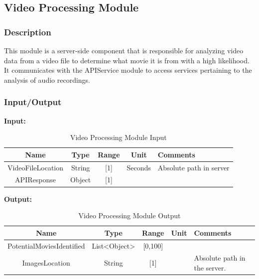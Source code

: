 \documentclass{article}
\begin{document}
\subsection{Video Processing Module}

\subsubsection{Description}

This module is a server-side component that is responsible for analyzing video data from a video file to determine what movie it is from with a high likelihood. It communicates with the APIService module to access services pertaining to the analysis of audio recordings.

\subsubsection{Input/Output}
\textbf{Input:}
\begin{table}[H]
    \caption{Video Processing Module Input}
    \centering
    \begin{tabularx}{0.7\textwidth}{|c|c|c|c|X|} \hline
        \textbf{Name} & \textbf{Type} & \textbf{Range} & \textbf{Unit} & \textbf{Comments} \\ \hline
        VideoFileLocation & String & [1] & Seconds & Absolute path in server \\ \hline
        APIResponse & Object & [1] & & \\ \hline
    \end{tabularx}
    \label{tab:Video_Processing_Input}
\end{table}

\textbf{Output:}
\begin{table}[H]
    \caption{Video Processing Module Output}
    \centering
    \begin{tabularx}{0.7\textwidth}{|c|c|c|c|X|} \hline
        \textbf{Name} & \textbf{Type} & \textbf{Range} & \textbf{Unit} & \textbf{Comments} \\ \hline
        PotentialMoviesIdentified & List<Object> & [0,100] & &\\ \hline
        ImagesLocation & String & [1] & & Absolute path in the server. \\ \hline
    \end{tabularx}
    \label{tab:Video_Processing_Output}
\end{table}
\end{document}
